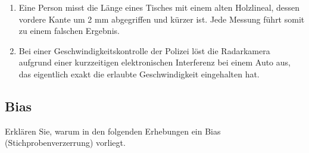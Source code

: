 \begin{enumerate}
\item
Eine Person misst die Länge eines Tisches mit einem alten Holzlineal, dessen vordere Kante um 2 mm abgegriffen und kürzer ist.
    Jede Messung führt somit zu einem falschen Ergebnis. 

\item Bei einer Geschwindigkeitskontrolle der Polizei löst die Radarkamera aufgrund einer kurzzeitigen elektronischen
    Interferenz bei einem Auto aus, das eigentlich exakt die erlaubte Geschwindigkeit eingehalten hat. 

\end{enumerate}
\newpage
\subsection{Bias}

Erklären Sie, warum in den folgenden Erhebungen ein Bias (Stichprobenverzerrung)
vorliegt.

